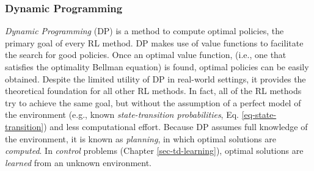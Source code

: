 \documentclass[a4paper, twoside, 12pt]{article}
\begin{document}
\subsubsection{Dynamic Programming}
\label{sec:orge14cf84}
\emph{Dynamic Programming} (DP) is a method to compute optimal policies, the primary
goal of every RL method. DP makes use of value functions to facilitate the
search for good policies. Once an optimal value function, (i.e., one that
satisfies the optimality Bellman equation) is found, optimal policies can be
easily obtained. Despite the limited utility of DP in real-world settings, it
provides the theoretical foundation for all other RL methods. In fact, all of
the RL methods try to achieve the same goal, but without the assumption of a
perfect model of the environment (e.g., known \emph{state-transition probabilities},
Eq. \ref{eq-state-transition}) and less computational effort. Because DP assumes
full knowledge of the environment, it is known as \emph{planning}, in which optimal
solutions are \emph{computed}. In \emph{control} problems (Chapter \ref{sec-td-learning}),
optimal solutions are \emph{learned} from an unknown environment.
\end{document}
